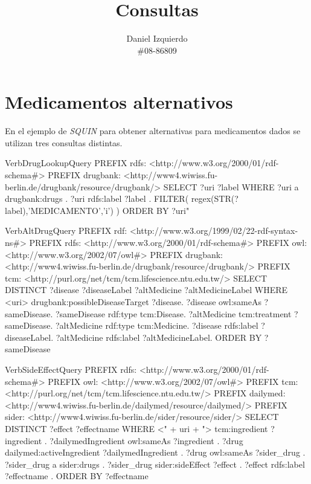 \documentclass{article}
\begin{document}
\title{Consultas }
\date{}
\author{Daniel Izquierdo \\ \#08-86809}

\maketitle

\section{Medicamentos alternativos}

En el ejemplo de \emph{SQUIN} para obtener alternativas para medicamentos dados
se utilizan tres consultas distintas.


\begin{SaveVerbatim}{VerbDrugLookupQuery}
PREFIX rdfs: <http://www.w3.org/2000/01/rdf-schema#>
PREFIX drugbank: <http://www4.wiwiss.fu-berlin.de/drugbank/resource/drugbank/>
SELECT ?uri ?label WHERE {
  ?uri a drugbank:drugs .
  ?uri rdfs:label ?label .
  FILTER( regex(STR(?label),'MEDICAMENTO','i') )
}
ORDER BY ?uri"
\end{SaveVerbatim}

\begin{SaveVerbatim}{VerbAltDrugQuery}
PREFIX rdf:  <http://www.w3.org/1999/02/22-rdf-syntax-ns#>
PREFIX rdfs: <http://www.w3.org/2000/01/rdf-schema#>
PREFIX owl:  <http://www.w3.org/2002/07/owl#>
PREFIX drugbank: <http://www4.wiwiss.fu-berlin.de/drugbank/resource/drugbank/>
PREFIX tcm:      <http://purl.org/net/tcm/tcm.lifescience.ntu.edu.tw/>
SELECT DISTINCT ?disease ?diseaseLabel ?altMedicine ?altMedicineLabel WHERE {
  <uri> drugbank:possibleDiseaseTarget ?disease.
  ?disease owl:sameAs ?sameDisease.
  ?sameDisease rdf:type tcm:Disease.
  ?altMedicine tcm:treatment ?sameDisease.
  ?altMedicine rdf:type tcm:Medicine.
  ?disease rdfs:label ?diseaseLabel.
  ?altMedicine rdfs:label ?altMedicineLabel.
}
ORDER BY ?sameDisease
\end{SaveVerbatim}

\begin{SaveVerbatim}{VerbSideEffectQuery}
PREFIX rdfs: <http://www.w3.org/2000/01/rdf-schema#>
PREFIX owl:  <http://www.w3.org/2002/07/owl#>
PREFIX tcm:      <http://purl.org/net/tcm/tcm.lifescience.ntu.edu.tw/>
PREFIX dailymed: <http://www4.wiwiss.fu-berlin.de/dailymed/resource/dailymed/>
PREFIX sider:    <http://www4.wiwiss.fu-berlin.de/sider/resource/sider/>
SELECT DISTINCT ?effect ?effectname WHERE {
        <" + uri + "> tcm:ingredient ?ingredient .
        ?dailymedIngredient owl:sameAs ?ingredient .
        ?drug dailymed:activeIngredient ?dailymedIngredient .
        ?drug owl:sameAs ?sider_drug .
        ?sider_drug a sider:drugs .
        ?sider_drug sider:sideEffect ?effect .
        ?effect rdfs:label ?effectname .
}
ORDER BY ?effectname
\end{SaveVerbatim}
\end{document}
